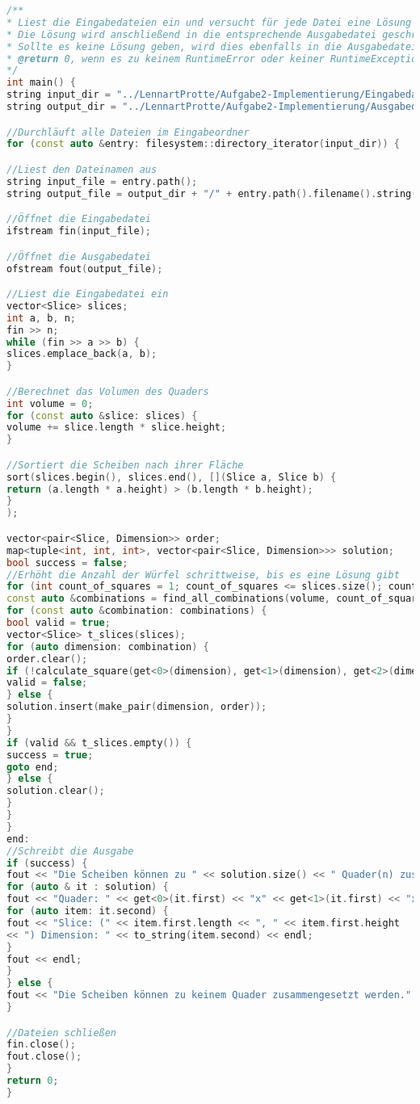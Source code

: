 \documentclass[a4paper,10pt,ngerman]{scrartcl}
\begin{document}
    \begin{lstlisting}[frame=single,language=C++,title=Methode main,breaklines=true,label={lst:code_main_extended}]
/**
* Liest die Eingabedateien ein und versucht für jede Datei eine Lösung entsprechend der Aufgabenstellung zu finden
* Die Lösung wird anschließend in die entsprechende Ausgabedatei geschrieben
* Sollte es keine Lösung geben, wird dies ebenfalls in die Ausgabedatei geschrieben
* @return 0, wenn es zu keinem RuntimeError oder keiner RuntimeException gekommen ist
*/
int main() {
string input_dir = "../LennartProtte/Aufgabe2-Implementierung/Eingabedateien_b";
string output_dir = "../LennartProtte/Aufgabe2-Implementierung/Ausgabedateien_b";

//Durchläuft alle Dateien im Eingabeordner
for (const auto &entry: filesystem::directory_iterator(input_dir)) {

//Liest den Dateinamen aus
string input_file = entry.path();
string output_file = output_dir + "/" + entry.path().filename().string();

//Öffnet die Eingabedatei
ifstream fin(input_file);

//Öffnet die Ausgabedatei
ofstream fout(output_file);

//Liest die Eingabedatei ein
vector<Slice> slices;
int a, b, n;
fin >> n;
while (fin >> a >> b) {
slices.emplace_back(a, b);
}

//Berechnet das Volumen des Quaders
int volume = 0;
for (const auto &slice: slices) {
volume += slice.length * slice.height;
}

//Sortiert die Scheiben nach ihrer Fläche
sort(slices.begin(), slices.end(), [](Slice a, Slice b) {
return (a.length * a.height) > (b.length * b.height);
}
);

vector<pair<Slice, Dimension>> order;
map<tuple<int, int, int>, vector<pair<Slice, Dimension>>> solution;
bool success = false;
//Erhöht die Anzahl der Würfel schrittweise, bis es eine Lösung gibt
for (int count_of_squares = 1; count_of_squares <= slices.size(); count_of_squares++) {
const auto &combinations = find_all_combinations(volume, count_of_squares, slices);
for (const auto &combination: combinations) {
bool valid = true;
vector<Slice> t_slices(slices);
for (auto dimension: combination) {
order.clear();
if (!calculate_square(get<0>(dimension), get<1>(dimension), get<2>(dimension), order, t_slices)) {
valid = false;
} else {
solution.insert(make_pair(dimension, order));
}
}
if (valid && t_slices.empty()) {
success = true;
goto end;
} else {
solution.clear();
}
}
}
end:
//Schreibt die Ausgabe
if (success) {
fout << "Die Scheiben können zu " << solution.size() << " Quader(n) zusammengesetzt werden." << endl;
for (auto & it : solution) {
fout << "Quader: " << get<0>(it.first) << "x" << get<1>(it.first) << "x" << get<2>(it.first) << endl;
for (auto item: it.second) {
fout << "Slice: (" << item.first.length << ", " << item.first.height
<< ") Dimension: " << to_string(item.second) << endl;
}
fout << endl;
}
} else {
fout << "Die Scheiben können zu keinem Quader zusammengesetzt werden." << endl;
}

//Dateien schließen
fin.close();
fout.close();
}
return 0;
}
    \end{lstlisting}
\end{document}
